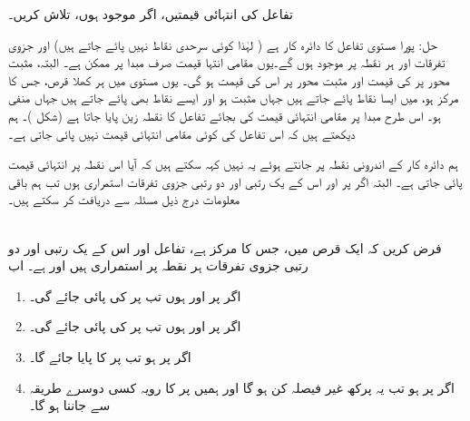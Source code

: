 تفاعل  کی انتہائی قیمتیں، اگر موجود ہوں، تلاش کریں۔

حل:\quad
 پورا مستوی  تفاعل  کا دائرہ کار   ہے ( لہٰذا کوئی سرحدی نقاط نہیں پائے جاتے ہیں) اور جزوی تفرقات  اور  ہر  نقطہ پر موجود ہوں گے۔یوں مقامی انتہا قیمت صرف مبدا پر ممکن ہے۔ البتہ، مثبت  محور پر   کی قیمت  اور مثبت  محور پر اس کی قیمت  ہو گی۔ یوں  مستوی  میں ہر  کھلا قرص، جس کا مرکز   ہو، میں  ایسا نقاط پائے جاتے ہیں جہاں  مثبت ہو اور ایسے نقاط بھی پائے جاتے ہیں جہاں  منفی ہو۔  اس طرح مبدا پر مقامی انتہائی قیمت کی بجائے  تفاعل کا نقطہ زین پایا جاتا ہے (شکل )۔ ہم دیکھتے ہیں کہ اس تفاعل کی  کوئی مقامی انتہائی قیمت نہیں پائی جاتی ہے۔

ہم  دائرہ کار  کے اندرونی نقطہ  پر   جانتے ہوئے یہ نہیں  کہہ سکتے ہیں کہ آیا اس نقطہ پر انتہائی قیمت پائی جاتی ہے۔ البتہ اگر  پر   اور اس کے یک رتبی اور دو رتبی  جزوی تفرقات استمراری ہوں  تب ہم باقی معلومات درج ذیل مسئلہ سے دریافت کر سکتے ہیں۔

\\
فرض کریں کہ ایک قرص میں، جس  کا مرکز  ہے،  تفاعل  اور اس کے یک رتبی اور دو رتبی   جزوی تفرقات ہر نقطہ پر  استمراری ہیں  اور  ہے۔ اب
\begin{enumerate}[1.]
\item
اگر  پر  اور  ہوں    تب  پر  کی پائی جائے گی۔
\item
اگر  پر  اور  ہوں   تب  پر  کی پائی جائے گی۔
\item
اگر  پر   ہو   تب  پر  کا پایا جائے گا۔
\item
اگر   پر  ہو تب یہ پرکھ غیر فیصلہ کن ہو  گا اور ہمیں  پر  کا رویہ  کسی دوسرے طریقہ سے جاننا ہو گا۔
\end{enumerate}

